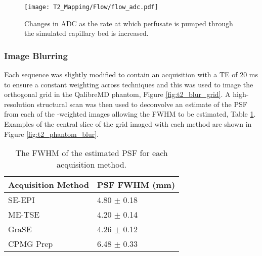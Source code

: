 \begin{figure}[H]
	\centering
	\texttt{[image: T2\_Mapping/Flow/flow\_adc.pdf]}
	\caption{Changes in ADC as the rate at which perfusate is pumped through the simulated capillary bed is increased.}
	\label{fig:t2_flow_adc}	
\end{figure} 

\subsubsection{Image Blurring}

Each sequence was slightly modified to contain an acquisition with a \ac{TE} of 20 ms to ensure a constant \ttwo weighting across techniques and this was used to image the orthogonal grid in the QalibreMD phantom, Figure \ref{fig:t2_blur_grid}. A high-resolution structural scan was then used to deconvolve an estimate of the \ac{PSF} from each of the \ttwo-weighted images allowing the \ac{FWHM} to be estimated, Table \ref{tab:t2_phantom_blur}. Examples of the central slice of the grid imaged with each method are shown in Figure \ref{fig:t2_phantom_blur}. 

\begin{table}[H]
	\centering
	\begin{tabular}{l|l}
		Acquisition   Method & PSF FWHM (mm)        \\ \hline
		SE-EPI               & 4.80   $\pm$ 0.18    \\ \hline
		ME-TSE               & 4.20 $\pm$ 0.14      \\ \hline
		GraSE                & 4.26   $\pm$ 0.12    \\ \hline
		CPMG   \ttwo Prep    & 6.48   $\pm$ 0.33                    
	\end{tabular}
	\caption{The \ac{FWHM} of the estimated \ac{PSF} for each acquisition method.}
	\label{tab:t2_phantom_blur}
\end{table}

